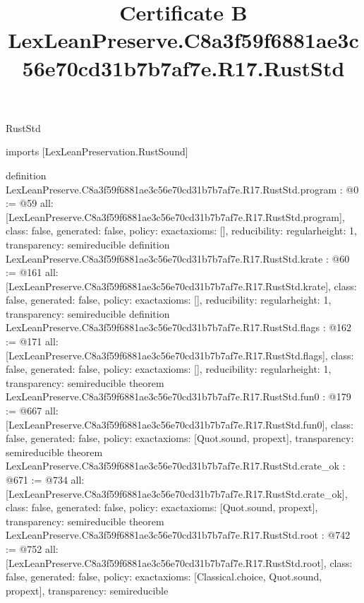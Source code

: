 \begin{lexlean}{RustStd}
\title{Certificate B LexLeanPreserve.C8a3f59f6881ae3c56e70cd31b7b7af7e.R17.RustStd}
\begin{coremodule}
imports [LexLeanPreservation.RustSound]

definition LexLeanPreserve.C8a3f59f6881ae3c56e70cd31b7b7af7e.R17.RustStd.program : @0 := @59 {
  all: [LexLeanPreserve.C8a3f59f6881ae3c56e70cd31b7b7af7e.R17.RustStd.program],
  class: false,
  generated: false,
  policy: exact{axioms: []},
  reducibility: regular{height: 1},
  transparency: semireducible
}
definition LexLeanPreserve.C8a3f59f6881ae3c56e70cd31b7b7af7e.R17.RustStd.krate : @60 := @161 {
  all: [LexLeanPreserve.C8a3f59f6881ae3c56e70cd31b7b7af7e.R17.RustStd.krate],
  class: false,
  generated: false,
  policy: exact{axioms: []},
  reducibility: regular{height: 1},
  transparency: semireducible
}
definition LexLeanPreserve.C8a3f59f6881ae3c56e70cd31b7b7af7e.R17.RustStd.flags : @162 := @171 {
  all: [LexLeanPreserve.C8a3f59f6881ae3c56e70cd31b7b7af7e.R17.RustStd.flags],
  class: false,
  generated: false,
  policy: exact{axioms: []},
  reducibility: regular{height: 1},
  transparency: semireducible
}
theorem LexLeanPreserve.C8a3f59f6881ae3c56e70cd31b7b7af7e.R17.RustStd.fun0 : @179 := @667 {
  all: [LexLeanPreserve.C8a3f59f6881ae3c56e70cd31b7b7af7e.R17.RustStd.fun0],
  class: false,
  generated: false,
  policy: exact{axioms: [Quot.sound, propext]},
  transparency: semireducible
}
theorem LexLeanPreserve.C8a3f59f6881ae3c56e70cd31b7b7af7e.R17.RustStd.crate_ok : @671 := @734 {
  all: [LexLeanPreserve.C8a3f59f6881ae3c56e70cd31b7b7af7e.R17.RustStd.crate_ok],
  class: false,
  generated: false,
  policy: exact{axioms: [Quot.sound, propext]},
  transparency: semireducible
}
theorem LexLeanPreserve.C8a3f59f6881ae3c56e70cd31b7b7af7e.R17.RustStd.root : @742 := @752 {
  all: [LexLeanPreserve.C8a3f59f6881ae3c56e70cd31b7b7af7e.R17.RustStd.root],
  class: false,
  generated: false,
  policy: exact{axioms: [Classical.choice, Quot.sound, propext]},
  transparency: semireducible
}


\end{coremodule}
\end{lexlean}
